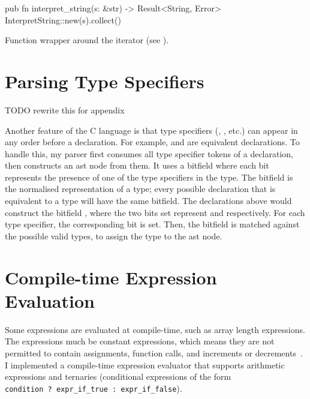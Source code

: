\documentclass[../00-main.tex]{subfiles}
\begin{document}
\begin{listing}[!t]
  \begin{RustListing}
    pub fn interpret_string(s: &str) -> Result<String, Error> {
        InterpretString::new(s).collect()
    }
  \end{RustListing}
  \caption{Function wrapper around the  iterator (see ).}
  \label{app:lst:interpret string function}
\end{listing}


\section{Parsing Type Specifiers}\label{app:sec:parsing type specifiers}

\begin{mrwComment}
TODO rewrite this for appendix
\end{mrwComment}

Another feature of the C language is that type specifiers (, , etc.) can appear in any order before a declaration.
For example,  and  are equivalent declarations.
To handle this, my parser first consumes all type specifier tokens of a declaration, then constructs an  \gls{ast} node from them.
It uses a bitfield where each bit represents the presence of one of the type specifiers in the type.
The bitfield is the normalised representation of a type; every possible declaration that is equivalent to a type will have the same bitfield.
The declarations above would construct the bitfield , where the two bits set represent  and  respectively.
For each type specifier, the corresponding bit is set.
Then, the bitfield is matched against the possible valid types, to assign the type to the \gls{ast} node.


\section{Compile-time Expression Evaluation}\label{app:sec:compile time expression evaluation}

Some expressions are evaluated at compile-time, such as array length expressions.
The expressions much be constant expressions, which means they are not permitted to contain assignments, function calls, and increments or decrements~.
I implemented a compile-time expression evaluator that supports arithmetic expressions and ternaries (conditional expressions of the form \texttt{condition~?~expr_if_true~:~expr_if_false}).
\end{document}
